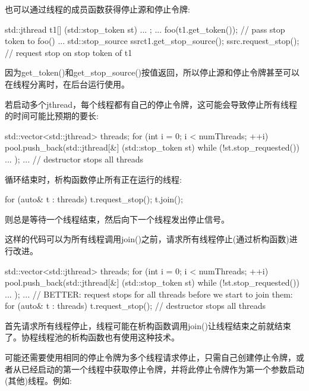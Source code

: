 也可以通过线程的成员函数获得停止源和停止令牌:

\begin{cpp}
std::jthread t1{[] (std::stop_token st) {
						...
				}};
...
foo(t1.get_token()); // pass stop token to foo()
...
std::stop_source ssrc{t1.get_stop_source()};
ssrc.request_stop(); // request stop on stop token of t1
\end{cpp}

因为get\_token()和get\_stop\_source()按值返回，所以停止源和停止令牌甚至可以在线程分离时，在后台运行使用。


若启动多个jthread，每个线程都有自己的停止令牌，这可能会导致停止所有线程的时间可能比预期的要长:

\begin{cpp}
{
	std::vector<std::jthread> threads;
	for (int i = 0; i < numThreads; ++i) {
		pool.push_back(std::jthread{[&] (std::stop_token st) {
				while (!st.stop_requested()) {
					...
				}
		}});
	}
	...
} // destructor stops all threads
\end{cpp}

循环结束时，析构函数停止所有正在运行的线程:

\begin{cpp}
for (auto& t : threads) {
	t.request_stop();
	t.join();
}
\end{cpp}

则总是等待一个线程结束，然后向下一个线程发出停止信号。

这样的代码可以为所有线程调用join()之前，请求所有线程停止(通过析构函数)进行改进。

\begin{cpp}
{
	std::vector<std::jthread> threads;
	for (int i = 0; i < numThreads; ++i) {
		pool.push_back(std::jthread{[&] (std::stop_token st) {
				while (!st.stop_requested()) {
					...
				}
		}});
	}
	...
	// BETTER: request stops for all threads before we start to join them:
	for (auto& t : threads) {
		t.request_stop();
	}
} // destructor stops all threads
\end{cpp}

首先请求所有线程停止，线程可能在析构函数调用join()让线程结束之前就结束了。协程线程池的析构函数也有使用这种技术。


可能还需要使用相同的停止令牌为多个线程请求停止，只需自己创建停止令牌，或者从已经启动的第一个线程中获取停止令牌，并将此停止令牌作为第一个参数启动(其他)线程。例如:

